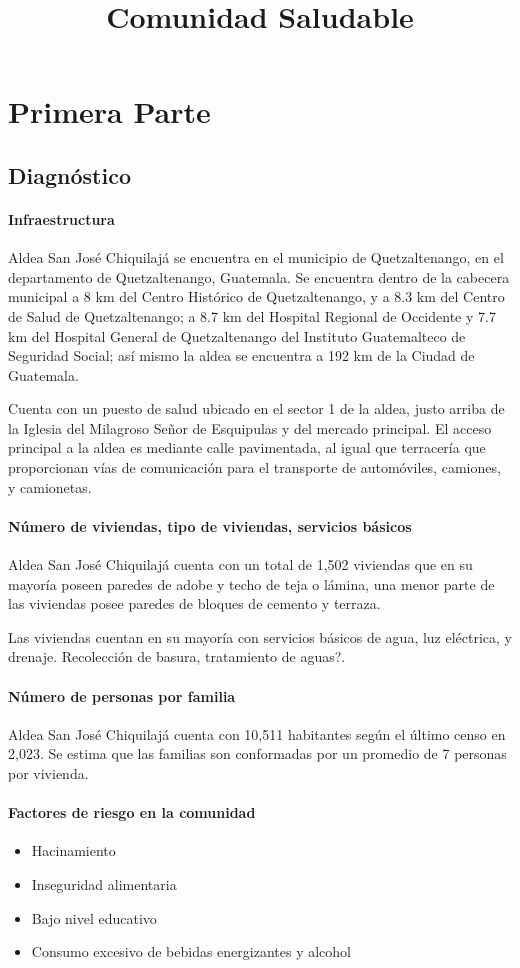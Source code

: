 \documentclass{article}
\title{Comunidad Saludable}
\begin{document}
\section{Primera Parte}
\subsection{Diagnóstico}
\paragraph{Infraestructura}
Aldea San José Chiquilajá se encuentra en el municipio de Quetzaltenango, en el departamento de Quetzaltenango, Guatemala. Se encuentra dentro de la cabecera municipal a 8 km del Centro Histórico de Quetzaltenango, y a 8.3 km del Centro de Salud de Quetzaltenango; a 8.7 km del Hospital Regional de Occidente y 7.7 km del Hospital General de Quetzaltenango del Instituto Guatemalteco de Seguridad Social; así mismo la aldea se encuentra a 192 km de la Ciudad de Guatemala.

Cuenta con un puesto de salud ubicado en el sector 1 de la aldea, justo arriba de la Iglesia del Milagroso Señor de Esquipulas y del mercado principal. El acceso principal a la aldea es mediante calle pavimentada, al igual que terracería que proporcionan vías de comunicación para el transporte de automóviles, camiones, y camionetas.

\paragraph{Número de viviendas, tipo de viviendas, servicios básicos}
Aldea San José Chiquilajá cuenta con un total de 1,502 viviendas que en su mayoría poseen paredes de adobe y techo de teja o lámina, una menor parte de las viviendas posee paredes de bloques de cemento y terraza.

Las viviendas cuentan en su mayoría con servicios básicos de agua, luz eléctrica, y drenaje. Recolección de basura, tratamiento de aguas?.

\paragraph{Número de personas por familia}
Aldea San José Chiquilajá cuenta con 10,511 habitantes según el último censo en 2,023. Se estima que las familias son conformadas por un promedio de 7 personas por vivienda.

\paragraph{Factores de riesgo en la comunidad}
\begin{itemize}
	\item Hacinamiento
	\item Inseguridad alimentaria
	\item Bajo nivel educativo
	\item Consumo excesivo de bebidas energizantes y alcohol
\end{itemize}
\end{document}
